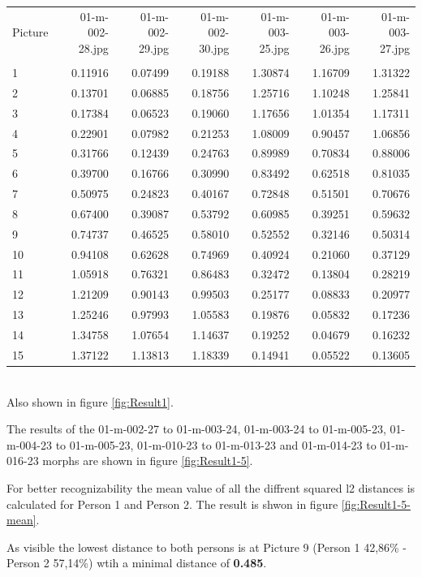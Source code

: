 \begin{tabular}{lrrrrrr}
	Picture & 01-m-002-28.jpg & 01-m-002-29.jpg & 01-m-002-30.jpg & 01-m-003-25.jpg & 01-m-003-26.jpg & 01-m-003-27.jpg \\
	 & & & & & & \\
	1 & 0.11916 & 0.07499 & 0.19188 & 1.30874 & 1.16709 & 1.31322\\
	2 & 0.13701 & 0.06885 & 0.18756 & 1.25716 & 1.10248 & 1.25841\\ 
	3 & 0.17384 & 0.06523 & 0.19060 & 1.17656 & 1.01354 & 1.17311\\ 
	4 & 0.22901 & 0.07982 & 0.21253 & 1.08009 & 0.90457 & 1.06856\\ 
	5 & 0.31766 & 0.12439 & 0.24763 & 0.89989 & 0.70834 & 0.88006\\ 
	6 & 0.39700 & 0.16766 & 0.30990 & 0.83492 & 0.62518 & 0.81035\\ 
	7 & 0.50975 & 0.24823 & 0.40167 & 0.72848 & 0.51501 & 0.70676\\ 
	8 & 0.67400 & 0.39087 & 0.53792 & 0.60985 & 0.39251 & 0.59632\\ 
	9 & 0.74737 & 0.46525 & 0.58010 & 0.52552 & 0.32146 & 0.50314\\ 
	10 & 0.94108 & 0.62628 & 0.74969 & 0.40924 & 0.21060 & 0.37129\\ 
	11 & 1.05918 & 0.76321 & 0.86483 & 0.32472 & 0.13804 & 0.28219\\ 
	12 & 1.21209 & 0.90143 & 0.99503 & 0.25177 & 0.08833 & 0.20977\\ 
	13 & 1.25246 & 0.97993 & 1.05583 & 0.19876 & 0.05832 & 0.17236\\ 
	14 & 1.34758 & 1.07654 & 1.14637 & 0.19252 & 0.04679 & 0.16232\\ 
	15 & 1.37122 & 1.13813 & 1.18339 & 0.14941 & 0.05522 & 0.13605\\ 
\end{tabular}\\


Also shown in figure \ref{fig:Result1}.

The results of the 01-m-002-27 to 01-m-003-24, 01-m-003-24 to 01-m-005-23, 01-m-004-23 to 01-m-005-23, 01-m-010-23 to 01-m-013-23 and 01-m-014-23 to 01-m-016-23 morphs are shown in figure \ref{fig:Result1-5}.

For better recognizability the mean value of all the diffrent squared l2 distances is calculated for Person 1 and Person 2. The result is shwon in figure \ref{fig:Result1-5-mean}.

As visible the lowest distance to both persons is at Picture 9 (Person 1 42,86\% - Person 2 57,14\%) wtih a minimal distance of \textbf{0.485}.\\

